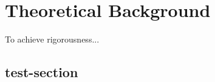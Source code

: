 \chapter{Theoretical Background}

To achieve rigorousness... \cite[80]{HEVN04}


\Blindtext[10]

\section{test-section}

\Blindtext[4]